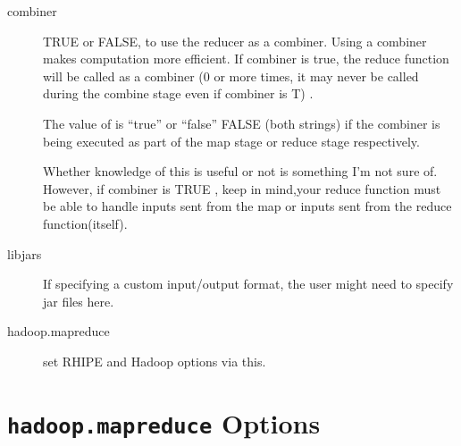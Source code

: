 \documentclass[letterpaper,10pt,english]{manual}
\begin{document}
\begin{description}
\item[combiner]
TRUE or FALSE, to use the reducer as a combiner. Using a combiner makes computation more efficient. If combiner is true, the reduce function will be called as a combiner (0 or more times, it may never be called during the combine stage even if combiner is T) .

The value of  is ``true'' or ``false'' FALSE (both strings) if the combiner is being executed as part of the map stage or reduce stage respectively.

Whether knowledge of this is useful or not is something I'm not sure
of. However, if combiner is TRUE , keep in mind,your reduce function must be
able to handle inputs sent from the map or inputs sent from the reduce
function(itself).

\item[libjars]
If specifying a custom input/output format, the user might need to specify
jar files here.

\item[hadoop.mapreduce]
set RHIPE and Hadoop options via this.

\end{description}


\section{\texttt{hadoop.mapreduce} Options}
\end{document}
